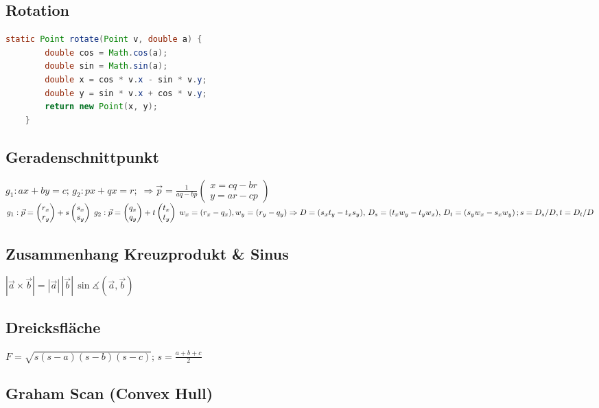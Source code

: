 \documentclass[10pt,a4paper,ngerman,oneside,]{article}
\begin{document}
\begin{multicols}{2}
\subsection{Rotation}
\begin{lstlisting}[language=java]
	static Point rotate(Point v, double a) {
		double cos = Math.cos(a);
		double sin = Math.sin(a);
		double x = cos * v.x - sin * v.y;
		double y = sin * v.x + cos * v.y;
		return new Point(x, y);
	}
\end{lstlisting}
\subsection{Geradenschnittpunkt}
$g_1: ax+by=c;\,g_2: px+qx=r;\;\Rightarrow \vec{p}=\frac{1}{aq-bp}\begin{pmatrix}
x = cq-br\\y=ar-cp
\end{pmatrix}$\\
$
g_1: \vec{p}=\begin{pmatrix}r_x\\r_y\end{pmatrix}+ s \begin{pmatrix}s_x\\s_y\end{pmatrix}\;
g_2: \vec{p}=\begin{pmatrix}q_x\\q_y\end{pmatrix}+ t \begin{pmatrix}t_x\\t_y\end{pmatrix}\; w_x=(r_x-q_x),  w_y=(r_y-q_y)\\
\Rightarrow D=(s_xt_y-t_xs_y),\, D_s=(t_xw_y-t_yw_x),\,
D_t=(s_yw_x-s_xw_y)\,; s=D_s/D, t=D_t/D$

\renewcommand{\tan}{\ensuremath{\operatorname{tan}}}
\renewcommand{\cot}{\ensuremath{\operatorname{cot}}}
\subsection{Zusammenhang Kreuzprodukt \& Sinus}
$|\vec{a}\times\vec{b}|=|\vec{a}| \, | \vec{b} | \, \sin \measuredangle (\vec{a},\vec{b})$
\subsection{Dreicksfläche}
$F=\sqrt{s(s-a)(s-b)(s-c)};\,s=\frac{a+b+c}{2}$

\subsection{Graham Scan (Convex Hull)}

\end{multicols}
\end{document}
